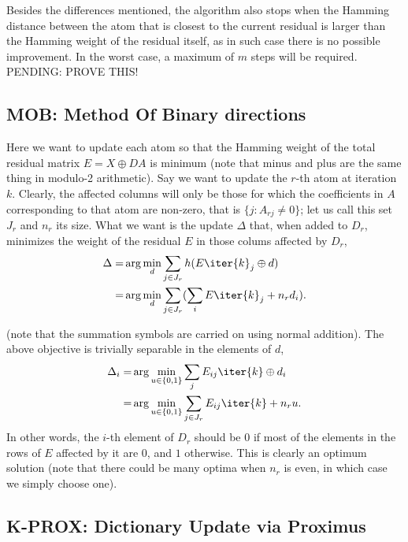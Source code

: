 \documentclass[a4paper]{IEEEtran}
\begin{document}
Besides the differences mentioned, the algorithm also stops when the Hamming distance between the atom that is closest to the current residual is larger than the Hamming weight of the residual itself, as in such case there is no possible improvement. %
In the worst case, a maximum of $m$ steps will be required.
PENDING: PROVE THIS!
 
\subsection{MOB: Method Of Binary directions}
 
Here we want to update each atom so that the Hamming weight of the total residual matrix $E = X \oplus DA$ is minimum (note that minus and plus are the same thing in modulo-2 arithmetic). Say we want to update the $r$-th atom at iteration $k$. Clearly, the affected columns will only be those for which the  coefficients in $A$  corresponding to that atom are non-zero, that is $\{j : A_{rj} \neq 0 \}$; let us call this set $J_r$ and $n_r$ its size. What we want is the update $\Delta$ that, when added to $D_r$, minimizes the weight of the residual $E$ in those colums affected by $D_r$,
 \begin{eqnarray}
 \Delta  =& \arg\min_d \sum_{j \in J_r}  h(E\iter{k}_j \oplus d) \\
 =& \arg\min_d \sum_{j \in J_r} (\sum_i E\iter{k}_j + n_r d_i).
\label{eq:mob1}
 \end{eqnarray}

(note that the summation symbols are carried on using normal addition). The above objective is trivially separable in the elements of $d$,
 \begin{eqnarray}
 \Delta_i  =& \arg\min_{u \in \{0,1\}} \sum_j E_{ij}\iter{k} \oplus d_i\\
 =& \arg\min_{u \in \{0,1\}} \sum_{j\in J_r} E_{ij}\iter{k} + n_r u.
\label{eq:mob2}
 \end{eqnarray}
In other words, the $i$-th element of $D_r$ should be $0$ if most of the elements in the rows of $E$ affected by it are $0$, and $1$ otherwise. 
This is clearly an optimum solution (note that there could be many optima  when $n_r$ is even, in which case we simply choose one).

\subsection{K-PROX: Dictionary Update via Proximus}
\end{document}
